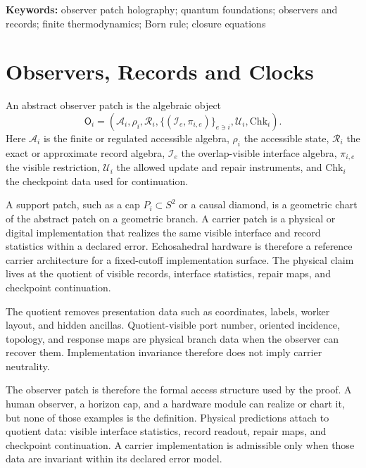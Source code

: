 \documentclass[11pt]{article}
\newcounter{none}
\begin{document}
\noindent\textbf{Keywords:} observer patch holography; quantum foundations; observers and records;
finite thermodynamics; Born rule; closure equations



\tableofcontents
\newpage

\section{Observers, Records and Clocks}
\label{sec:observer-language}

An abstract observer patch is the algebraic object
\[
\mathsf O_i=
\left(
\mathcal A_i,\rho_i,\mathcal R_i,
\{(\mathcal I_e,\pi_{i,e})\}_{e\ni i},
\mathcal U_i,\mathrm{Chk}_i
\right).
\]
Here \(\mathcal A_i\) is the finite or regulated accessible algebra, \(\rho_i\) the accessible
state, \(\mathcal R_i\) the exact or approximate record algebra, \(\mathcal I_e\) the overlap-visible
interface algebra, \(\pi_{i,e}\) the visible restriction, \(\mathcal U_i\) the allowed update and
repair instruments, and \(\mathrm{Chk}_i\) the checkpoint data used for continuation.

A support patch, such as a cap \(P_i\subset S^2\) or a causal diamond, is a geometric chart of the
abstract patch on a geometric branch. A carrier patch is a physical or digital implementation that
realizes the same visible interface and record statistics within a declared error. Echosahedral
hardware is therefore a reference carrier architecture for a fixed-cutoff implementation surface.
The physical claim lives at the quotient of visible records, interface statistics, repair maps, and
checkpoint continuation.

The quotient removes presentation data such as coordinates, labels, worker layout, and hidden
ancillas. Quotient-visible port number, oriented incidence, topology, and response maps are
physical branch data when the observer can recover them. Implementation invariance therefore does
not imply carrier neutrality.

The observer patch is therefore the formal access structure used by the proof. A human observer, a
horizon cap, and a hardware module can realize or chart it, but none of those examples is the
definition. Physical predictions attach to quotient data: visible interface statistics, record
readout, repair maps, and checkpoint continuation. A carrier implementation is admissible only when
those data are invariant within its declared error model.
\end{document}
